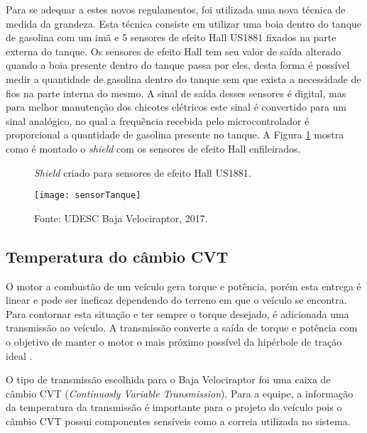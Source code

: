 Para se adequar a estes novos regulamentos, foi utilizada uma nova técnica de medida da grandeza. Esta técnica consiste em utilizar uma boia dentro do tanque de gasolina com um imã e 5 sensores de efeito Hall US1881 fixados na parte externa do tanque. Os sensores de efeito Hall tem seu valor de saída alterado quando a boia presente dentro do tanque passa por eles, desta forma é possível medir a quantidade de gasolina dentro do tanque sem que exista a necessidade de fios na parte interna do mesmo. A sinal de saída desses sensores é digital, mas para melhor manutenção dos chicotes elétricos este sinal é convertido para um sinal analógico, no qual a frequência recebida pelo microcontrolador é proporcional a quantidade de gasolina presente no tanque. A Figura \ref{fig:sensorTanque} mostra como é montado o \textit{shield} com os sensores de efeito Hall enfileirados.  

\begin{figure}[!htb]
	\centering
		\caption{\textit{Shield} criado para sensores de efeito Hall US1881.}
		\texttt{[image: sensorTanque]} 
		\caption*{Fonte: UDESC Baja Velociraptor, 2017.}
		\label{fig:sensorTanque}
\end{figure} 


\subsection{Temperatura do câmbio CVT}

O motor a combustão de um veículo gera torque e potência, porém esta entrega é linear e pode ser ineficaz dependendo do terreno em que o veículo se encontra. Para contornar esta situação e ter sempre o torque desejado, é adicionada uma transmissão ao veículo. A transmissão converte a saída de torque e potência com o objetivo de manter o motor o mais próximo possível da hipérbole de tração ideal \cite{Naunheimer2011}. 

O tipo de transmissão escolhida para o Baja Velociraptor foi uma caixa de câmbio CVT (\textit{Continuosly Variable Transmission}). Para a equipe, a informação da temperatura da transmissão é importante para o projeto do veículo pois o câmbio CVT possui componentes sensíveis como a correia utilizada no sistema. 

